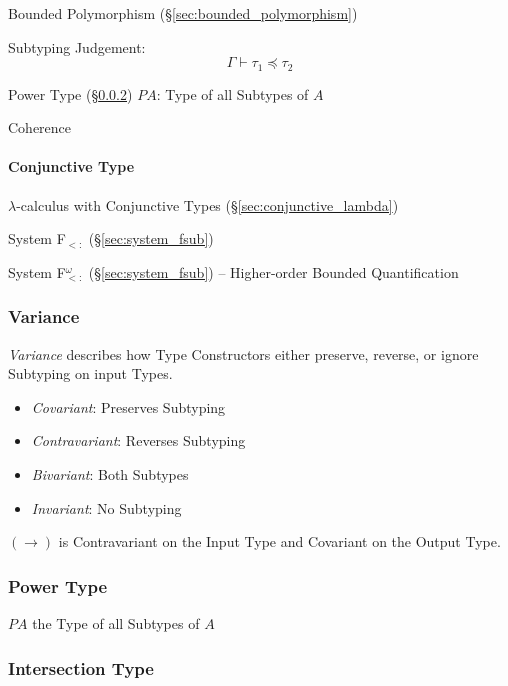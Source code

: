 Bounded Polymorphism (\S\ref{sec:bounded_polymorphism})

Subtyping Judgement:
\[
  \Gamma \vdash \tau_1 \preceq \tau_2
\]

Power Type (\S\ref{sec:power_type}) $P A$: Type of all Subtypes of $A$

Coherence



\paragraph{Conjunctive Type}\label{sec:conjunctive_type}\hfill

$\lambda$-calculus with Conjunctive Types
(\S\ref{sec:conjunctive_lambda})

System F$_{<:}$ (\S\ref{sec:system_fsub})

System F$_{<:}^\omega$ (\S\ref{sec:system_fsub}) -- Higher-order
Bounded Quantification



\subsubsection{Variance}\label{sec:type_variance}

\emph{Variance} describes how Type Constructors either preserve,
reverse, or ignore Subtyping on input Types.

\begin{itemize}
  \item \emph{Covariant}: Preserves Subtyping
  \item \emph{Contravariant}: Reverses Subtyping
  \item \emph{Bivariant}: Both Subtypes
  \item \emph{Invariant}: No Subtyping
\end{itemize}

$(\rightarrow)$ is Contravariant on the Input Type and Covariant on
the Output Type.



\subsubsection{Power Type}\label{sec:power_type}

$P A$ the Type of all Subtypes of $A$



\subsubsection{Intersection Type}\label{sec:intersection_type}

